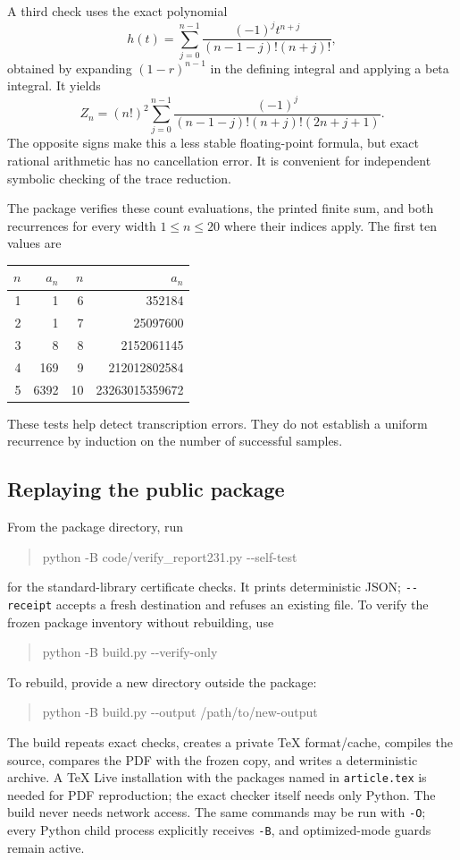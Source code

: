 \documentclass[11pt,letterpaper]{article}
\numberwithin{equation}{section}
\theoremstyle{definition}
\newcommand{\1}{\mathbf 1}
\begin{document}
A third check uses the exact polynomial
\begin{equation}
 h(t)=\sum_{j=0}^{n-1}
 \frac{(-1)^jt^{n+j}}{(n-1-j)!(n+j)!},
 \label{shr:h4:eq:hpoly}
\end{equation}
obtained by expanding $(1-r)^{n-1}$ in the defining integral and applying
a beta integral. It yields
\begin{equation}
 Z_n=(n!)^2\sum_{j=0}^{n-1}
 \frac{(-1)^j}{(n-1-j)!(n+j)!(2n+j+1)}.
 \label{shr:h4:eq:Zfinite}
\end{equation}
The opposite signs make this a less stable floating-point formula, but
exact rational arithmetic has no cancellation error. It is convenient
for independent symbolic checking of the trace reduction.

The package verifies these count evaluations, the printed finite sum,
and both recurrences for every width $1\le n\le20$ where their indices
apply. The first ten values are
\begin{center}
\begin{tabular}{r r@{\qquad}r r}
\toprule
$n$&$a_n$&$n$&$a_n$\\\midrule
1&1&6&352184\\
2&1&7&25097600\\
3&8&8&2152061145\\
4&169&9&212012802584\\
5&6392&10&23263015359672\\\bottomrule
\end{tabular}
\end{center}
These tests help detect transcription errors. They do not establish a
uniform recurrence by induction on the number of successful samples.

\subsection{Replaying the public package}
From the package directory, run
\begin{quote}\ttfamily
python -B code/verify\_report231.py -{}-self-test
\end{quote}
for the standard-library certificate checks. It prints deterministic JSON;
\texttt{-{}-receipt} accepts a fresh destination and refuses an existing
file. To verify the frozen package inventory without rebuilding, use
\begin{quote}\ttfamily
python -B build.py -{}-verify-only
\end{quote}
To rebuild, provide a new directory outside the package:
\begin{quote}\ttfamily
python -B build.py -{}-output /path/to/new-output
\end{quote}
The build repeats exact checks, creates a private TeX format/cache,
compiles the source, compares the PDF with the frozen copy, and writes a
deterministic archive. A TeX Live installation with the packages named in
\texttt{article.tex} is needed for PDF reproduction; the exact checker
itself needs only Python. The build never needs network access.
The same commands may be run with \texttt{-O}; every Python child process
explicitly receives \texttt{-B}, and optimized-mode guards remain active.
\end{document}
